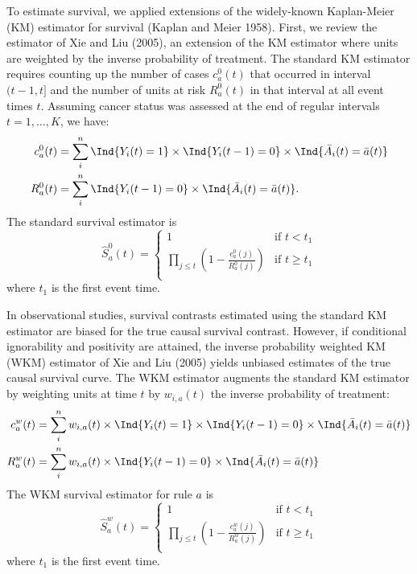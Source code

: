 \documentclass[
  11pt,
]{article}
\begin{document}
To estimate survival, we applied extensions of the widely-known
Kaplan-Meier (KM) estimator for survival (Kaplan and Meier 1958). First,
we review the estimator of Xie and Liu (2005), an extension of the KM
estimator where units are weighted by the inverse probability of
treatment. The standard KM estimator requires counting up the number of
cases \(c^0_{a}(t)\) that occurred in interval \((t - 1, t]\) and the
number of units at risk \(R^0_{a}(t)\) in that interval at all event
times \(t\). Assuming cancer status was assessed at the end of regular
intervals \(t = 1, \ldots, K\), we have: \[\begin{aligned}
c^0_{a} (t)
& = \sum_i^n \Ind{Y_i(t) = 1} \times \Ind{Y_i(t - 1) = 0} \times \Ind{\bar A_i (t) = \bar a(t)} \\
R^0_{a} (t)
& = \sum_i^n \Ind{Y_i(t - 1) = 0} \times \Ind{\bar A_i (t) = \bar a(t)}.
\end{aligned}\] The standard survival estimator is \[\hat S^0_{a}(t) =
\begin{cases}
1 & \text{if } t < t_1 \\
\prod_{j \le t} \left(1 - \frac{c^0_{a}(j)}{R^0_{a}(j)}\right) & \text{if } t \ge t_1 \\
\end{cases}\] where \(t_1\) is the first event time.

In observational studies, survival contrasts estimated using the
standard KM estimator are biased for the true causal survival contrast.
However, if conditional ignorability and positivity are attained, the
inverse probability weighted KM (WKM) estimator of Xie and Liu (2005)
yields unbiased estimates of the true causal survival curve. The WKM
estimator augments the standard KM estimator by weighting units at time
\(t\) by \(w_{i, a}(t)\) the inverse probability of treatment:
\[\begin{aligned}
c^w_{a} (t)
& = \sum_i^n w_{i, a}(t) \times \Ind{Y_i(t) = 1} \times \Ind{Y_i(t - 1) = 0} \times \Ind{\bar A_i (t) = \bar a(t)}\\
R^w_{a} (t)
& = \sum_i^n w_{i, a}(t) \times \Ind{Y_i(t - 1) = 0} \times \Ind{\bar A_i (t) = \bar a(t)}
\end{aligned}\] The WKM survival estimator for rule \(a\) is
\[\hat S^w_{a}(t) =
\begin{cases}
1 & \text{if } t < t_1 \\
\prod_{j \le t} \left(1 - \frac{c^w_{a}(j)}{R^w_{a}(j)}\right) & \text{if } t \ge t_1 \\
\end{cases}\] where \(t_1\) is the first event time.
\end{document}

